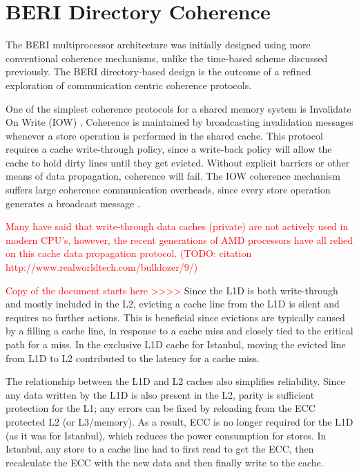\section{BERI Directory Coherence}
	\label{section_directory_coherence}
		The BERI multiprocessor architecture was initially designed using more conventional coherence mechanisms, unlike the time-based scheme discussed previously. The BERI directory-based design is the outcome of a refined exploration of communication centric coherence protocols.

		One of the simplest coherence protocols for a shared memory system is Invalidate On Write (IOW) \cite{Hennessy06}. Coherence is maintained by broadcasting invalidation messages whenever a store operation is performed in the shared cache. This protocol requires a cache write-through policy, since a write-back policy will allow the cache to hold dirty lines until they get evicted. Without explicit barriers or other means of data propagation, coherence will fail. The IOW coherence mechanism suffers large coherence communication overheads, since every store operation generates a broadcast message \cite{Lawrence98,Tomasevic92,Hennessy06}. 
		
		\textcolor{red}{Many have said that write-through data caches (private) are not actively used in modern CPU's, however, the recent generations of AMD processors have all relied on this cache data propagation protocol. (TODO: citation http://www.realworldtech.com/bulldozer/9/)}
		
		
		
		
		\textcolor{red}{Copy of the document starts here >>>>}
		 Since the L1D is both write-through and mostly included in the L2, evicting a cache line from the L1D is silent and requires no further actions. This is beneficial since evictions are typically caused by a filling a cache line, in response to a cache miss and closely tied to the critical path for a miss. In the exclusive L1D cache for Istanbul, moving the evicted line from L1D to L2 contributed to the latency for a cache miss.
		
		The relationship between the L1D and L2 caches also simplifies reliability. Since any data written by the L1D is also present in the L2, parity is sufficient protection for the L1; any errors can be fixed by reloading from the ECC protected L2 (or L3/memory). As a result, ECC is no longer required for the L1D (as it was for Istanbul), which reduces the power consumption for stores. In Istanbul, any store to a cache line had to first read to get the ECC, then recalculate the ECC with the new data and then finally write to the cache.
		
